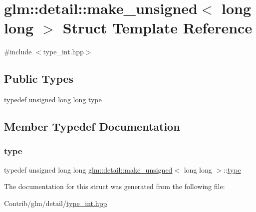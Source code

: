 \hypertarget{structglm_1_1detail_1_1make__unsigned_3_01long_01long_01_4}{}\section{glm\+:\+:detail\+:\+:make\+\_\+unsigned$<$ long long $>$ Struct Template Reference}
\label{structglm_1_1detail_1_1make__unsigned_3_01long_01long_01_4}


{\ttfamily \#include $<$type\+\_\+int.\+hpp$>$}

\subsection*{Public Types}
\begin{DoxyCompactItemize}
\item 
typedef unsigned long long \mbox{\hyperlink{structglm_1_1detail_1_1make__unsigned_3_01long_01long_01_4_adb9a738bcdd4b53058383168bb8585b1}{type}}
\end{DoxyCompactItemize}


\subsection{Member Typedef Documentation}
\mbox{\label{structglm_1_1detail_1_1make__unsigned_3_01long_01long_01_4_adb9a738bcdd4b53058383168bb8585b1}} 
\subsubsection{\texorpdfstring{type}{type}}
{\footnotesize\ttfamily typedef unsigned long long \mbox{\hyperlink{structglm_1_1detail_1_1make__unsigned}{glm\+::detail\+::make\+\_\+unsigned}}$<$ long long $>$\+::\mbox{\hyperlink{structglm_1_1detail_1_1make__unsigned_3_01long_01long_01_4_adb9a738bcdd4b53058383168bb8585b1}{type}}}



The documentation for this struct was generated from the following file\+:\begin{DoxyCompactItemize}
\item 
Contrib/glm/detail/\mbox{\hyperlink{type__int_8hpp}{type\+\_\+int.\+hpp}}\end{DoxyCompactItemize}
